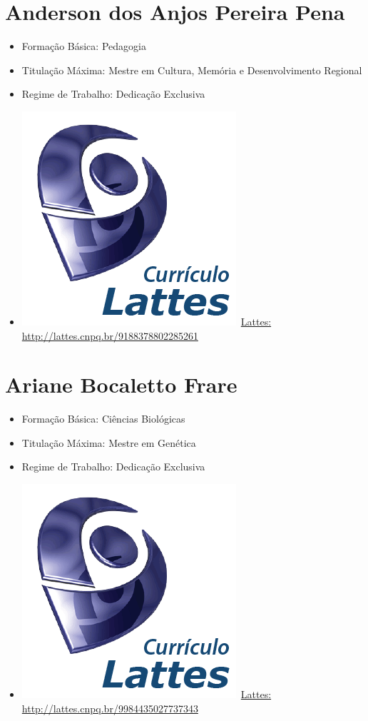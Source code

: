 \documentclass[11pt,fleqn]{book} %
\begin{document}
\section{Anderson dos Anjos Pereira Pena}\label{AndersonPena}
\begin{itemize}
	\item Formação Básica: Pedagogia
	\item Titulação Máxima: Mestre em Cultura, Memória e Desenvolvimento Regional
	\item Regime de Trabalho: Dedicação Exclusiva
	\item \includegraphics[scale=.03]{Pictures/lattes}~\href{http://lattes.cnpq.br/9188378802285261}{Lattes: http://lattes.cnpq.br/9188378802285261}
\end{itemize}

\section{Ariane Bocaletto Frare}\label{ArianeFrare}
\begin{itemize}
	\item Formação Básica: Ciências Biológicas
	\item Titulação Máxima: Mestre em Genética
	\item Regime de Trabalho: Dedicação Exclusiva
	\item \includegraphics[scale=.03]{Pictures/lattes}~\href{http://lattes.cnpq.br/9984435027737343}{Lattes: http://lattes.cnpq.br/9984435027737343}
\end{itemize}
\end{document}
